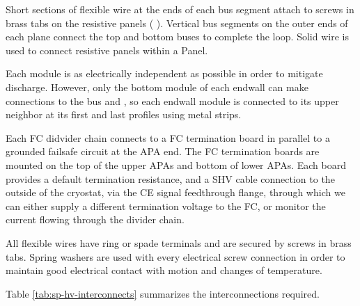 Short sections of flexible wire at the ends of each  bus segment
attach to screws in brass tabs on the  resistive panels ( ).
Vertical  bus segments on the outer ends of each  plane connect
the top and bottom  buses to complete the loop.  Solid wire is used
to connect resistive panels within a  Panel.

Each  module is as electrically independent as possible in order to
mitigate discharge.  However, only the bottom module of each endwall
can make connections to the  bus and , so each endwall module
is connected to its upper neighbor at its first and last profiles
using metal strips.

Each FC didvider chain connects to a FC termination board in parallel to a grounded failsafe circuit at the APA end.  The FC termination boards are mounted on the top of the upper APAs and bottom of lower APAs.  Each board provides a default termination resistance, and a SHV cable connection to the outside of the cryostat, via the CE signal feedthrough flange, through which we can either supply a different termination voltage to the FC, or monitor the current flowing through the divider chain.

All flexible wires have ring or spade terminals and are secured by
screws in brass tabs.  Spring washers are used with every electrical
screw connection in order to maintain good electrical contact with
motion and changes of temperature.

Table \ref{tab:sp-hv-interconnects} summarizes the interconnections
required.

